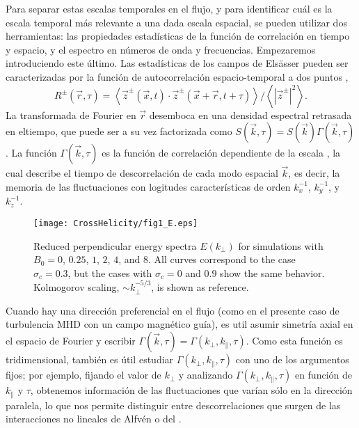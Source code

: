 Para separar estas escalas temporales en el flujo, y para identificar
cuál es la escala temporal más relevante a una dada escala espacial,
se pueden utilizar dos herramientas: las propiedades estadísticas de
la función de correlación en tiempo y espacio, y el espectro en
números de onda y frecuencias. Empezaremos introduciendo este
último. Las estadísticas de los campos de Els\"asser pueden ser
caracterizadas por la función de autocorrelación espacio-temporal a
dos puntos \cite{servidio_time_2011},
\begin{equation}
  R^\pm(\vec{r},\tau) = \left\langle \vec{z}^\pm( \vec{x},t) \cdot
    \vec{z} ^\pm( \vec{x} + \vec{r},t+\tau) \right\rangle \Big/ 
  \left\langle \left|{\vec{z}^\pm}\right|^2 \right\rangle.
  \label{eq:Rzij}
\end{equation}
La transformada de Fourier en $\vec{r}$ desemboca en una densidad
espectral retrasada en eltiempo, que puede ser a su vez factorizada
como $S(\vec{k},\tau) = S(\vec{k})\Gamma(\vec{k},\tau)$. La función
$\Gamma(\vec{k},\tau)$ es la función de correlación dependiente de la
escala \cite{heisenberg_zur_1948,
  comte-bellot_simple_1971,orszag_numerical_1972}, la cual describe el
tiempo de descorrelación de cada modo espacial $\vec{k}$, es decir, la
memoria de las fluctuaciones con logitudes características de orden
$k_x^{-1}$, $k_y^{-1}$, y $k_z^{-1}$.

\begin{figure}
\centering
\texttt{[image: CrossHelicity/fig1\_E.eps]}
\caption{Reduced perpendicular energy spectra $E(k_\perp)$ for
  simulations with $B_0=0$, $0.25$, $1$, $2$, $4$, and $8$. All curves
  correspond to the case $\sigma_c = 0.3$, but the cases with $\sigma_c = 0$ and
  $0.9$ show the same behavior. Kolmogorov scaling,
  $\sim k_\perp^{-5/3}$, is shown as reference.}
\label{fig1:E}
\end{figure}

Cuando hay una dirección preferencial en el flujo (como en el presente
caso de turbulencia MHD con un campo magnético guía), es util asumir
simetría axial en el espacio de Fourier y escribir
$\Gamma(\vec{k},\tau) = \Gamma(k_\perp,k_\parallel,\tau)$. Como esta
función es tridimensional, también es útil estudiar
$\Gamma(k_\perp,k_\parallel,\tau)$ con uno de los argumentos fijos;
por ejemplo, fijando el valor de $k_\perp$ y analizando
$\Gamma(k_\perp,k_\parallel,\tau)$ en función de $k_\parallel$ y
$\tau$, obtenemos información de las fluctuaciones que varían sólo en
la dirección paralela, lo que nos permite distinguir entre
descorrelaciones que surgen de las interacciones no lineales de Alfvén
o del \sweeping.

